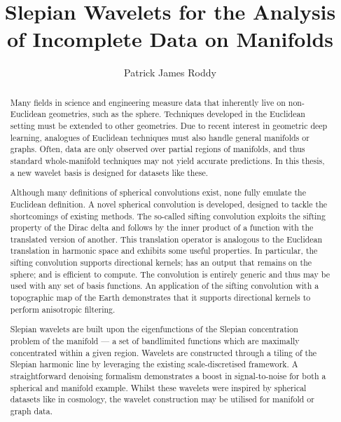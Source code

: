 
\title{Slepian Wavelets for the Analysis of Incomplete Data on Manifolds}
\author{Patrick James Roddy}

\maketitle
\makedeclaration{}

\begin{abstract} %
	Many fields in science and engineering measure data that inherently live on non-Euclidean geometries, such as the sphere.
	Techniques developed in the Euclidean setting must be extended to other geometries.
	Due to recent interest in geometric deep learning, analogues of Euclidean techniques must also handle general manifolds or graphs.
	Often, data are only observed over partial regions of manifolds, and thus standard whole-manifold techniques may not yield accurate predictions.
	In this thesis, a new wavelet basis is designed for datasets like these.

	Although many definitions of spherical convolutions exist, none fully emulate the Euclidean definition.
	A novel spherical convolution is developed, designed to tackle the shortcomings of existing methods.
	The so-called sifting convolution exploits the sifting property of the Dirac delta and follows by the inner product of a function with the translated version of another.
	This translation operator is analogous to the Euclidean translation in harmonic space and exhibits some useful properties.
	In particular, the sifting convolution supports directional kernels; has an output that remains on the sphere; and is efficient to compute.
	The convolution is entirely generic and thus may be used with any set of basis functions.
	An application of the sifting convolution with a topographic map of the Earth demonstrates that it supports directional kernels to perform anisotropic filtering.

	Slepian wavelets are built upon the eigenfunctions of the Slepian concentration problem of the manifold --- a set of bandlimited functions which are maximally concentrated within a given region.
	Wavelets are constructed through a tiling of the Slepian harmonic line by leveraging the existing scale-discretised framework.
	A straightforward denoising formalism demonstrates a boost in signal-to-noise for both a spherical and manifold example.
	Whilst these wavelets were inspired by spherical datasets like in cosmology, the wavelet construction may be utilised for manifold or graph data.
\end{abstract}

